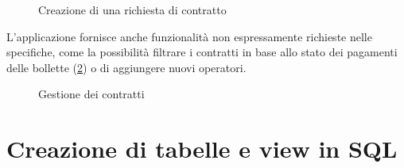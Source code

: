 \documentclass[a4paper,12pt]{report}
\begin{document}
\begin{figure}[H]
    \centering{}
    \caption{Creazione di una richiesta di contratto}
    \label{fig:sub-wizard}
\end{figure}

L'applicazione fornisce anche funzionalità non espressamente richieste nelle specifiche, come la possibilità filtrare i contratti in base allo stato dei pagamenti delle bollette (\cref{fig:sub-management}) o di aggiungere nuovi operatori.

\begin{figure}[H]
    \centering{}
    \caption{Gestione dei contratti}
    \label{fig:sub-management}
\end{figure}

\appendix
\chapter{Creazione di tabelle e view in SQL}
\end{document}
